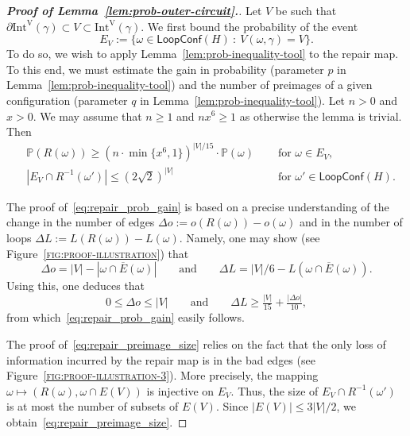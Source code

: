 \documentclass[12pt,reqno]{article}
\renewcommand{\Pr}{\mathbb{P}}
\newcommand{\LC}{\mathsf{LoopConf}}
\newcommand{\reffig}[1] {\textsc{\ref{#1}}}
\newcommand{\IntVert}[1]{\mathrm{Int}^\mathrm{V}(#1)}
\newcommand{\BadEdgesBefore}{\overline E}
\newcommand{\shiftFunc}{R}
\newcommand{\shift}[1]{{\shiftFunc(#1)}}
\begin{document}
\begin{proof}[{\bf Proof of Lemma~\ref{lem:prob-outer-circuit}.}]
\label{sec:proof of lemma}
Let $V$ be such that $\partial \IntVert\gamma \subset V \subset \IntVert\gamma$. We first bound the probability of the event
\[ E_V := \{ \omega \in \LC(H) ~:~ V(\omega,\gamma)=V \} .\]
To do so, we wish to apply Lemma~\ref{lem:prob-inequality-tool} to the repair map. To this end, we must estimate the gain in probability (parameter $p$ in Lemma~\ref{lem:prob-inequality-tool}) and the number of preimages of a given configuration (parameter $q$ in Lemma~\ref{lem:prob-inequality-tool}). Let $n>0$ and $x>0$. We may assume that $n \ge 1$ and $nx^6 \ge 1$ as otherwise the lemma is trivial. Then
\begin{align}
    &\Pr(\shift\omega) \ge (n \cdot \min\{x^6,1\})^{|V|/15} \cdot \Pr(\omega) &\quad\text{ for }\omega \in E_V ,\label{eq:repair_prob_gain}\\
&|E_V \cap \shiftFunc^{-1}(\omega')| \le (2 \sqrt{2})^{|V|} &\quad\text{ for }\omega' \in \LC(H) .\label{eq:repair_preimage_size}
\end{align}

The proof of~\eqref{eq:repair_prob_gain} is based on a precise understanding of the change in the number of edges $\Delta o := o(\shift\omega) - o(\omega)$ and in the number of loops $\Delta L := L(\shift\omega) - L(\omega)$. Namely, one may show (see Figure~\reffig{fig:proof-illustration}) that
\[ \Delta o = |V| - |\omega \cap \BadEdgesBefore(\omega)| \qquad\text{and}\qquad \Delta L = |V| / 6 - L(\omega \cap \BadEdgesBefore(\omega)) .\]
  Using this, one deduces that
  \[ 0 \le \Delta o \le |V| \qquad\text{and}\qquad \Delta L \ge \tfrac{|V|}{15} + \tfrac{|\Delta o|}{10} ,\]
  from which~\eqref{eq:repair_prob_gain} easily follows.

The proof of~\eqref{eq:repair_preimage_size} relies on the fact that the only loss of information incurred by the repair map is in the bad edges (see Figure~\reffig{fig:proof-illustration-3}). More precisely, the mapping $\omega \mapsto (\shift\omega, \omega \cap E(V))$ is injective on $E_V$. Thus, the size of $E_V \cap \shiftFunc^{-1}(\omega')$ is at most the number of subsets of $E(V)$. Since $|E(V)| \le 3|V|/2$, we obtain~\eqref{eq:repair_preimage_size}.


\end{proof}
\end{document}
